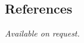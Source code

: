 \documentclass[margin,line]{cv/cv}
\begin{document}
\begin{resume}
    \section{\mysidestyle References}
     {\sl Available on request.}


\end{resume}
\end{document}
